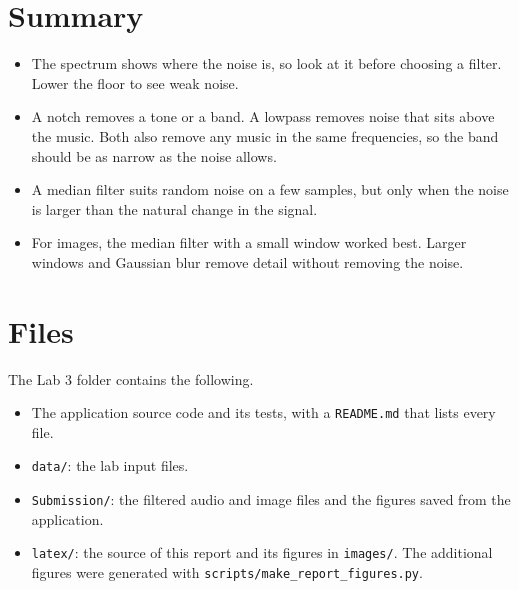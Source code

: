 \documentclass[12pt, letterpaper]{article}
\begin{document}
\section{Summary}

\begin{itemize}
  \item The spectrum shows where the noise is, so look at it before choosing a filter. Lower the floor to see weak noise.
  \item A notch removes a tone or a band. A lowpass removes noise that sits above the music. Both also remove any music in the same frequencies, so the band should be as narrow as the noise allows.
  \item A median filter suits random noise on a few samples, but only when the noise is larger than the natural change in the signal.
  \item For images, the median filter with a small window worked best. Larger windows and Gaussian blur remove detail without removing the noise.
\end{itemize}

\section{Files}

The Lab 3 folder contains the following.
\begin{itemize}
  \item The application source code and its tests, with a \texttt{README.md} that lists every file.
  \item \texttt{data/}: the lab input files.
  \item \texttt{Submission/}: the filtered audio and image files and the figures saved from the application.
  \item \texttt{latex/}: the source of this report and its figures in \texttt{images/}. The additional figures were generated with \texttt{scripts/make\_report\_figures.py}.
\end{itemize}
\end{document}
